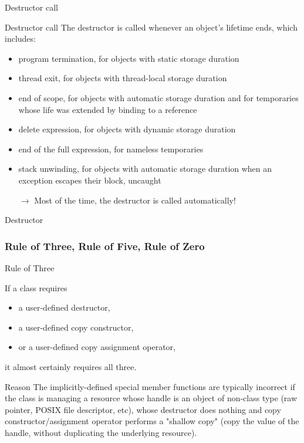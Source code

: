 \begin{frame}{Destructor call}{}
  \begin{block}{Destructor call}
    The destructor is called whenever an object's lifetime ends, which includes:
    \begin{itemize}
    \item
      program termination, for objects with static storage duration
    \item
      thread exit, for objects with thread-local storage duration
    \item
      end of scope, for objects with automatic storage duration and for temporaries whose life was extended by binding to a reference
    \item
      delete expression, for objects with dynamic storage duration
    \item
      end of the full expression, for nameless temporaries
    \item
      stack unwinding, for objects with automatic storage duration when an exception escapes their block, uncaught
    \item[$\to$]
      Most of the time, the destructor is called automatically!
    \end{itemize}
  \end{block}
\end{frame}

\begin{frame}{Destructor}{}
  \begin{example}[Destructor]
  \end{example}
\end{frame}


\subsubsection{Rule of Three, Rule of Five, Rule of Zero}

\begin{frame}{Rule of Three}{}
  \begin{definition}
    If a class requires
    \begin{itemize}
    \item
      a user-defined destructor,
    \item
      a user-defined copy constructor,
    \item
      or a user-defined copy assignment operator,
    \end{itemize}
    it almost certainly requires all three.
  \end{definition}

  \begin{block}{Reason}
    The implicitly-defined special member functions are typically incorrect if the class is managing a resource whose handle is an object of non-class type (raw pointer, POSIX file descriptor, etc), whose destructor does nothing and copy constructor/assignment operator performs a "shallow copy" (copy the value of the handle, without duplicating the underlying resource).
  \end{block}
\end{frame}

